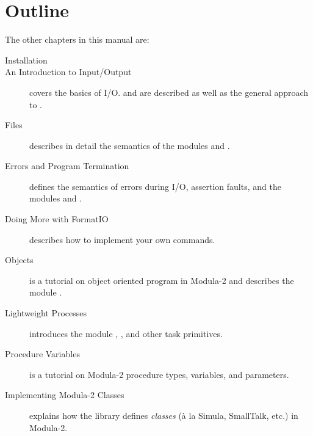 \section{Outline}

The other chapters in this manual are:

\begin{description}
\item[Installation]

\item[An Introduction to Input/Output]
    covers the basics of I/O.   and
     are described as well as the general approach
    to .
\item[Files]
    describes in detail the semantics of the modules
     and .
\item[Errors and Program Termination]
    defines the semantics
    of errors during I/O, assertion faults, and the
    modules  and .
\item[Doing More with FormatIO]
    describes how to implement your own  commands.
\item[Objects]
    is a tutorial on object oriented program in Modula-2 and
    describes the module .
\item[Lightweight Processes]
    introduces the module , ,
    and other task primitives.  

\item[Procedure Variables]
    is a tutorial on Modula-2 procedure types, variables, and
    parameters.

\item[Implementing Modula-2 Classes]
    explains how the library defines {\em classes}
    (\`{a} la Simula, SmallTalk, etc.) in Modula-2.
\end{description}    

